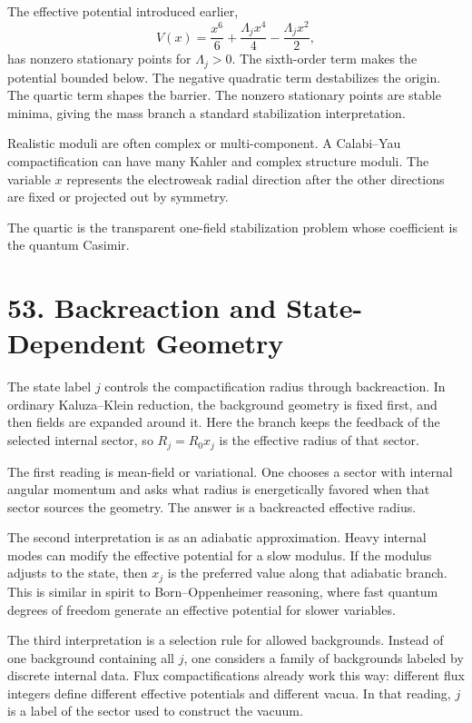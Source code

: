 \documentclass[11pt]{article}
\newcommand{\Lspin}{\Lambda_j}
\begin{document}
The effective potential introduced earlier,
\[
        V(x)=\frac{x^6}{6}+\frac{\Lspin x^4}{4}
        -\frac{\Lspin x^2}{2},
\]
has nonzero stationary points for \(\Lspin>0\). The sixth-order term makes the potential bounded below. The negative quadratic term destabilizes the origin. The quartic term shapes the barrier. The nonzero stationary points are stable minima, giving the mass branch a standard stabilization interpretation.

Realistic moduli are often complex or multi-component. A Calabi--Yau compactification can have many Kahler and complex structure moduli. The variable \(x\) represents the electroweak radial direction after the other directions are fixed or projected out by symmetry.

The quartic is the transparent one-field stabilization problem whose coefficient is the quantum Casimir.

\section*{53. Backreaction and State-Dependent Geometry}

The state label \(j\) controls the compactification radius through backreaction. In ordinary Kaluza--Klein reduction, the background geometry is fixed first, and then fields are expanded around it. Here the branch keeps the feedback of the selected internal sector, so \(R_j=R_0x_j\) is the effective radius of that sector.

The first reading is mean-field or variational. One chooses a sector with internal angular momentum and asks what radius is energetically favored when that sector sources the geometry. The answer is a backreacted effective radius.

The second interpretation is as an adiabatic approximation. Heavy internal modes can modify the effective potential for a slow modulus. If the modulus adjusts to the state, then \(x_j\) is the preferred value along that adiabatic branch. This is similar in spirit to Born--Oppenheimer reasoning, where fast quantum degrees of freedom generate an effective potential for slower variables.

The third interpretation is a selection rule for allowed backgrounds. Instead of one background containing all \(j\), one considers a family of backgrounds labeled by discrete internal data. Flux compactifications already work this way: different flux integers define different effective potentials and different vacua. In that reading, \(j\) is a label of the sector used to construct the vacuum.
\end{document}
